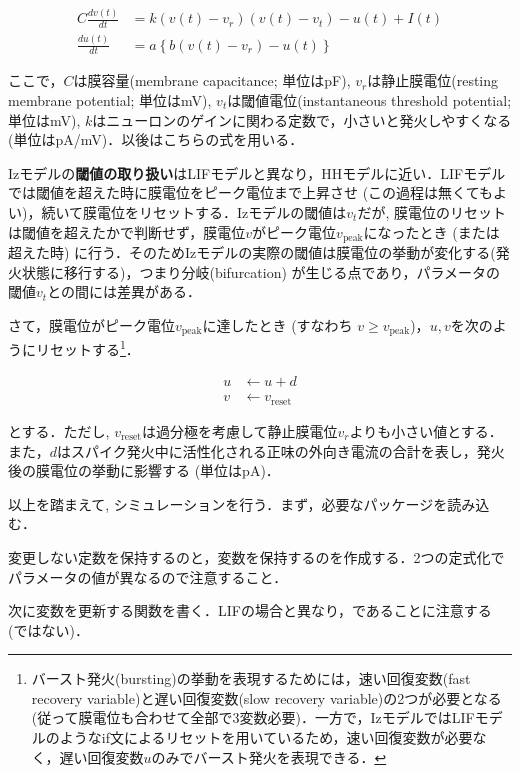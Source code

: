 \begin{align}
C\frac{dv(t)}{dt}&=k\left(v(t)-v_r\right)\left(v(t)-v_t\right)-u(t)+I(t) \\
\frac{du(t)}{dt}&=a\left\{b\left(v(t)-v_{r}\right)-u(t)\right\}
\end{align} 


ここで，$C$は膜容量(membrane capacitance; 単位はpF), $v_r$は静止膜電位(resting membrane potential; 単位はmV), $v_t$は閾値電位(instantaneous threshold potential; 単位はmV), $k$はニューロンのゲインに関わる定数で，小さいと発火しやすくなる (単位はpA/mV)．以後はこちらの式を用いる．

Izモデルの\textbf{閾値の取り扱い}はLIFモデルと異なり，HHモデルに近い．LIFモデルでは閾値を超えた時に膜電位をピーク電位まで上昇させ (この過程は無くてもよい)，続いて膜電位をリセットする．Izモデルの閾値は$v_t$だが, 膜電位のリセットは閾値を超えたかで判断せず，膜電位$v$がピーク電位$v_{\text{peak}}$になったとき (または超えた時) に行う．そのためIzモデルの実際の閾値は膜電位の挙動が変化する(発火状態に移行する)，つまり分岐(bifurcation) が生じる点であり，パラメータの閾値$v_t$との間には差異がある．

さて，膜電位がピーク電位$v_{\text{peak}}$に達したとき (すなわち  $v \geq v_{\text{peak}}$)，$u, v$を次のようにリセットする\footnote{バースト発火(bursting)の挙動を表現するためには，速い回復変数(fast recovery variable)と遅い回復変数(slow recovery variable)の2つが必要となる(従って膜電位も合わせて全部で3変数必要)．一方で，IzモデルではLIFモデルのようなif文によるリセットを用いているため，速い回復変数が必要なく，遅い回復変数$u$のみでバースト発火を表現できる．}．


\begin{align} 
u&\leftarrow u+d\\
v&\leftarrow v_{\text{reset}}
\end{align}


とする．ただし, $v_{\text{reset}}$は過分極を考慮して静止膜電位$v_r$よりも小さい値とする．また，$d$はスパイク発火中に活性化される正味の外向き電流の合計を表し，発火後の膜電位の挙動に影響する (単位はpA)．

以上を踏まえて, シミュレーションを行う．まず，必要なパッケージを読み込む．

変更しない定数を保持するのと，変数を保持するのを作成する．2つの定式化でパラメータの値が異なるので注意すること．

次に変数を更新する関数を書く．LIFの場合と異なり，であることに注意する (ではない)．

